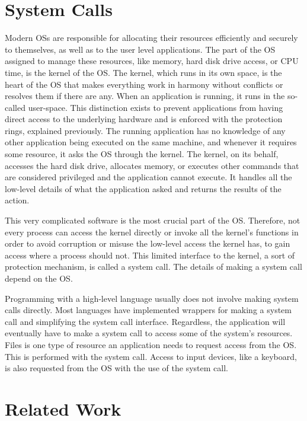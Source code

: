 \section{System Calls}\label{sec:syscalls}
Modern \ac{OS}s are responsible for allocating their resources efficiently and securely to themselves, as well as to the user level applications. The part of the \ac{OS} assigned to manage these resources, like memory, hard disk drive access, or \ac{CPU} time, is the kernel of the \ac{OS}. The kernel, which runs in its own space, is the heart of the \ac{OS} that makes everything work in harmony without conflicts or resolves them if there are any. When an application is running, it runs in the so-called user-space. This distinction exists to prevent applications from having direct access to the underlying hardware and is enforced with the protection rings, explained previously. The running application has no knowledge of any other application being executed on the same machine, and whenever it requires some resource, it asks the \ac{OS} through the kernel. The kernel, on its behalf, accesses the hard disk drive, allocates memory, or executes other commands that are considered privileged and the application cannot execute. It handles all the low-level details of what the application asked and returns the results of the action. 

\par This very complicated software is the most crucial part of the \ac{OS}. Therefore, not every process can access the kernel directly or invoke all the kernel's functions in order to avoid corruption or misuse the low-level access the kernel has, to gain access where a process should not. This limited interface to the kernel, a sort of protection mechanism, is called a system call. The details of making a system call depend on the \ac{OS}.

\par Programming with a high-level language usually does not involve making system calls directly. Most languages have implemented wrappers for making a system call and simplifying the system call interface. Regardless, the application will eventually have to make a system call to access some of the system's resources. Files is one type of resource an application needs to request access from the \ac{OS}. This is performed with the  system call. Access to input devices, like a keyboard, is also requested from the \ac{OS} with the use of the  system call.

\section{Related Work}\label{sec:related}

